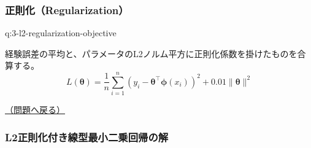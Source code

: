\documentclass[
  pandoc]{bxjsarticle}
\begin{document}
\subsubsection{正則化（Regularization）}\label{ux6b63ux5247ux5316regularization-1}

\begin{answerbox}[phantomlabel=a:3-l2-regularization-objective]{q:3-l2-regularization-objective}

経験誤差の平均と、パラメータのL2ノルム平方に正則化係数を掛けたものを合算する。
\[
L(\boldsymbol{\theta}) = \frac{1}{n} \sum_{i=1}^n (y_i - \boldsymbol{\theta}^\top \boldsymbol{\phi}(x_i))^2 + 0.01 \|\boldsymbol{\theta}\|^2
\]

\hfill 

\hyperref[q:3-l2-regularization-objective]{（問題へ戻る）}

\end{answerbox}

\subsubsection{L2正則化付き線型最小二乗回帰の解}\label{l2ux6b63ux5247ux5316ux4ed8ux304dux7ddaux578bux6700ux5c0fux4e8cux4e57ux56deux5e30ux306eux89e3-1}
\end{document}
